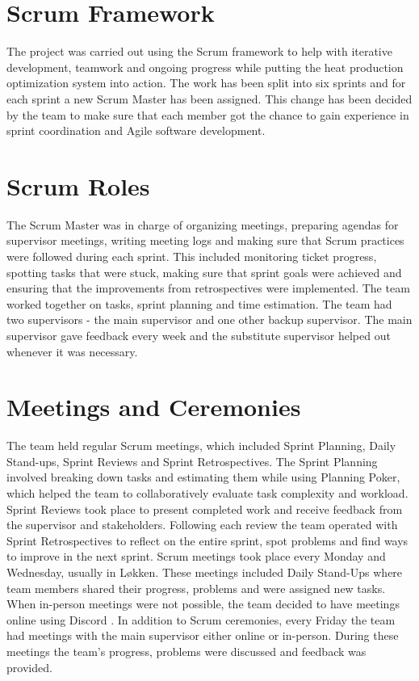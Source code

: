 \section{Scrum Framework}
The project was carried out using the Scrum framework to help with iterative development, teamwork and ongoing progress while putting the heat production optimization system into action. The work has been split into six sprints and for each sprint a new Scrum Master has been assigned. This change has been decided by the team to make sure that each member got the chance to gain experience in sprint coordination and Agile software development.

\section{Scrum Roles}
The Scrum Master was in charge of organizing meetings, preparing agendas for supervisor meetings, writing meeting logs and making sure that Scrum practices were followed during each sprint. This included monitoring ticket progress, spotting tasks that were stuck, making sure that sprint goals were achieved and ensuring that the improvements from retrospectives were implemented. The team worked together on tasks, sprint planning and time estimation. The team had two supervisors - the main supervisor and one other backup supervisor. The main supervisor gave feedback every week and the substitute supervisor helped out whenever it was necessary.

\section{Meetings and Ceremonies}
The team held regular Scrum meetings, which included Sprint Planning, Daily Stand-ups, Sprint Reviews and Sprint Retrospectives. The Sprint Planning involved breaking down tasks and estimating them while using Planning Poker, which helped the team to collaboratively evaluate task complexity and workload. Sprint Reviews took place to present completed work and receive feedback from the supervisor and stakeholders. Following each review the team operated with Sprint Retrospectives to reflect on the entire sprint, spot problems and find ways to improve in the next sprint. Scrum meetings took place every Monday and Wednesday, usually in Løkken. These meetings included Daily Stand-Ups where team members shared their progress, problems and were assigned new tasks. When in-person meetings were not possible, the team decided to have meetings online using Discord \cite{discord}. In addition to Scrum ceremonies, every Friday the team had meetings with the main supervisor either online or in-person. During these meetings the team's progress, problems were discussed and feedback was provided.

